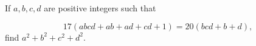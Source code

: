 If $a, b, c, d$ are positive integers such that

\[
17(abcd + ab + ad + cd + 1) = 20(bcd + b + d),
\]find $a^2 + b^2 + c^2 + d^2$.
